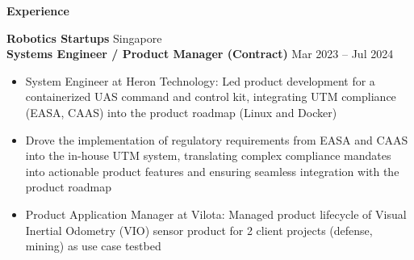 \documentclass[10t]{article}
\begin{document}


\newpage
\begin{center}
    \textbf{Experience}
\end{center}

\textbf{Robotics Startups} \hfill Singapore\\
\textbf{Systems Engineer / Product Manager (Contract)} \hfill Mar 2023 -- Jul 2024
\begin{itemize}[noitemsep]
    \item System Engineer at Heron Technology: Led product development for a containerized UAS command and control kit, integrating UTM compliance (EASA, CAAS) into the product roadmap (Linux and Docker)
    \item Drove the implementation of regulatory requirements from EASA and CAAS into the in-house UTM system, translating complex compliance mandates into actionable product features and ensuring seamless integration with the product roadmap
    \item Product Application Manager at Vilota: Managed product lifecycle of Visual Inertial Odometry (VIO) sensor product for 2 client projects (defense, mining) as use case testbed
\end{itemize}
\end{document}
